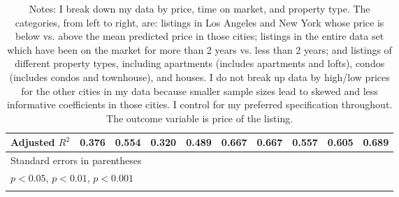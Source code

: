 \begin{landscape}
{\begin{longtable}{l*{9}{c}}
Adjusted \(R^{2}\)  &       0.376         &       0.554         &       0.320         &       0.489         &       0.667         &       0.667         &       0.557         &       0.605         &       0.689         \\
\hline\hline
\multicolumn{10}{l}{\footnotesize Standard errors in parentheses}\\
\multicolumn{10}{l}{\footnotesize \sym{*} \(p<0.05\), \sym{**} \(p<0.01\), \sym{***} \(p<0.001\)}\\
\caption*{Notes: I break down my data by price, time on market, and property type. The categories, from left to right, are: listings in Los Angeles and New York whose price is below vs. above the mean predicted price in those cities; listings in the entire data set which have been on the market for more than 2 years vs. less than 2 years; and listings of different property types, including apartments (includes apartments and lofts), condos (includes condos and townhouse), and houses. I do not break up data by high/low prices for the other cities in my data because smaller sample sizes lead to skewed and less informative coefficients in those cities. I control for my preferred specification throughout. The outcome variable is price of the listing.}\\
\end{longtable}
}

\end{landscape}

